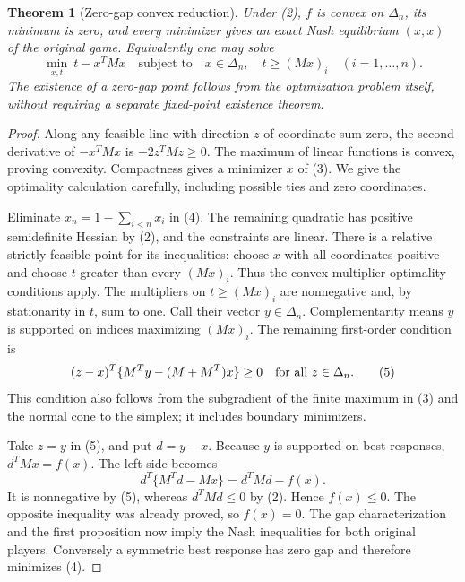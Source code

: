 \documentclass[11pt]{article}
\newtheorem{theorem}{Theorem}
\theoremstyle{remark}\newtheorem{remark}[theorem]{Remark}
\begin{document}
\begin{theorem}[Zero-gap convex reduction]
Under (2), $f$ is convex on $\Delta_n$, its minimum is zero, and every minimizer gives an exact Nash equilibrium $(x,x)$ of the original game. Equivalently one may solve
\[
 \min_{x,t}\ t-x^TMx\quad\text{subject to}\quad
 x\in\Delta_n,\quad t\ge(Mx)_i\quad(i=1,\ldots,n).
 \tag{4}
\]
The existence of a zero-gap point follows from the optimization problem itself, without requiring a separate fixed-point existence theorem.
\end{theorem}
\begin{proof}
Along any feasible line with direction $z$ of coordinate sum zero, the second derivative of $-x^TMx$ is $-2z^TMz\ge0$. The maximum of linear functions is convex, proving convexity. Compactness gives a minimizer $x$ of (3). We give the optimality calculation carefully, including possible ties and zero coordinates.

Eliminate $x_n=1-\sum_{i<n}x_i$ in (4). The remaining quadratic has positive semidefinite Hessian by (2), and the constraints are linear. There is a relative strictly feasible point for its inequalities: choose $x$ with all coordinates positive and choose $t$ greater than every $(Mx)_i$. Thus the convex multiplier optimality conditions apply. The multipliers on $t\ge(Mx)_i$ are nonnegative and, by stationarity in $t$, sum to one. Call their vector $y\in\Delta_n$. Complementarity means $y$ is supported on indices maximizing $(Mx)_i$. The remaining first-order condition is
\[
 (z-x)^T\{M^Ty-(M+M^T)x\}\ge0
 \quad\hbox{for all }z\in\Delta_n.
 \tag{5}
\]
This condition also follows from the subgradient of the finite maximum in (3) and the normal cone to the simplex; it includes boundary minimizers.

Take $z=y$ in (5), and put $d=y-x$. Because $y$ is supported on best responses, $d^TMx=f(x)$. The left side becomes
\[
 d^T\{M^Td-Mx\}=d^TMd-f(x).
\]
It is nonnegative by (5), whereas $d^TMd\le0$ by (2). Hence $f(x)\le0$. The opposite inequality was already proved, so $f(x)=0$. The gap characterization and the first proposition now imply the Nash inequalities for both original players. Conversely a symmetric best response has zero gap and therefore minimizes (4).
\end{proof}
\end{document}
